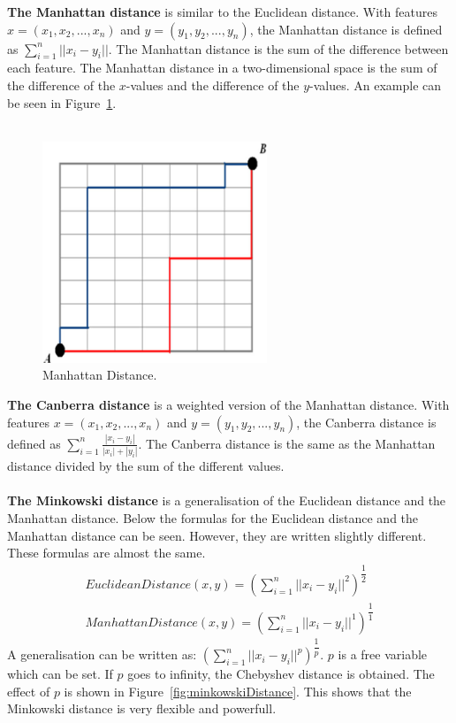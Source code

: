 \noindent \textbf{The Manhattan distance} is similar to the Euclidean distance. With features $x = (x_1, x_2,..., x_n)$ and $y = (y_1, y_2,..., y_n)$, the Manhattan distance is defined as $\sum_{i=1}^{n}||x_i-y_i||$. The Manhattan distance is the sum of the difference between each feature. \cite{manhattanDistance} The Manhattan distance in a two-dimensional space is the sum of the difference of the $x$-values and the difference of the $y$-values. An example can be seen in Figure~\ref{fig:manhattanDistance}. \\\\

\begin{figure}[H]
\centering
\includegraphics[width=0.6\textwidth]{Figures/manhattanDistance}
\decoRule
\caption[Manhattan Distance]{Manhattan Distance. \cite{manhattanDistance}}
\label{fig:manhattanDistance}
\end{figure}

\noindent \textbf{The Canberra distance} is a weighted version of the Manhattan distance. With features $x = (x_1, x_2,..., x_n)$ and $y = (y_1, y_2,..., y_n)$, the Canberra distance is defined as $\sum_{i=1}^{n}\frac{| x_i - y_i |}{ |x_i| + |y_i|}$. The Canberra distance is the same as the Manhattan distance divided by the sum of the different values. \cite{canberraDistance} \\
\\
\noindent \textbf{The Minkowski distance} is a generalisation of the Euclidean distance and the Manhattan distance. Below the formulas for the Euclidean distance and the Manhattan distance can be seen. However, they are written slightly different. These formulas are almost the same.
\begin{align}
EuclideanDistance(x, y) = (\sum_{i=1}^{n}||x_i-y_i||^2)^{\dfrac{1}{2}} \\
ManhattanDistance(x, y) = (\sum_{i=1}^{n}||x_i-y_i||^1)^{\dfrac{1}{1}}
\end{align}
\noindent A generalisation can be written as: $(\sum_{i=1}^{n}||x_i-y_i||^p)^{\dfrac{1}{p}}$. $p$ is a free variable which can be set. If $p$ goes to infinity, the Chebyshev distance is obtained. The effect of $p$ is shown in Figure~\ref{fig:minkowskiDistance}. This shows that the Minkowski distance is very flexible and powerfull. \cite{minkowskiDistanceExplain} \\\\

